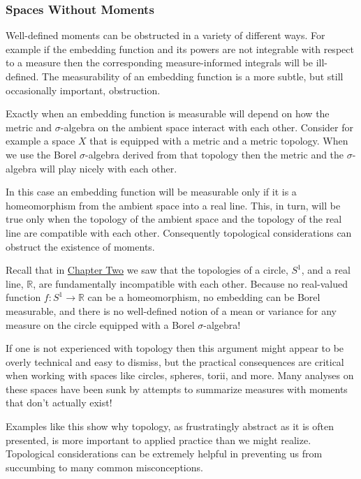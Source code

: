 \documentclass[
  letterpaper,
  DIV=11,
  numbers=noendperiod]{scrartcl}
\begin{document}
\hypertarget{spaces-without-moments}{%
\subsubsection{Spaces Without Moments}\label{spaces-without-moments}}

Well-defined moments can be obstructed in a variety of different ways.
For example if the embedding function and its powers are not integrable
with respect to a measure then the corresponding measure-informed
integrals will be ill-defined. The measurability of an embedding
function is a more subtle, but still occasionally important,
obstruction.

Exactly when an embedding function is measurable will depend on how the
metric and \(\sigma\)-algebra on the ambient space interact with each
other. Consider for example a space \(X\) that is equipped with a metric
and a metric topology. When we use the Borel \(\sigma\)-algebra derived
from that topology then the metric and the \(\sigma\)-algebra will play
nicely with each other.

In this case an embedding function will be measurable only if it is a
homeomorphism from the ambient space into a real line. This, in turn,
will be true only when the topology of the ambient space and the
topology of the real line are compatible with each other. Consequently
topological considerations can obstruct the existence of moments.

Recall that in
\href{https://betanalpha.github.io/assets/chapters_html/spaces.html}{Chapter
Two} we saw that the topologies of a circle, \(S^{1}\), and a real line,
\(\mathbb{R}\), are fundamentally incompatible with each other. Because
no real-valued function \(f: S^{1} \rightarrow \mathbb{R}\) can be a
homeomorphism, no embedding can be Borel measurable, and there is no
well-defined notion of a mean or variance for any measure on the circle
equipped with a Borel \(\sigma\)-algebra!

If one is not experienced with topology then this argument might appear
to be overly technical and easy to dismiss, but the practical
consequences are critical when working with spaces like circles,
spheres, torii, and more. Many analyses on these spaces have been sunk
by attempts to summarize measures with moments that don't actually
exist!

Examples like this show why topology, as frustratingly abstract as it is
often presented, is more important to applied practice than we might
realize. Topological considerations can be extremely helpful in
preventing us from succumbing to many common misconceptions.
\end{document}
